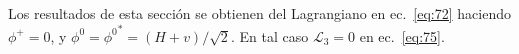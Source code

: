 Los resultados de esta secci\'on se obtienen del Lagrangiano en ec.~\eqref{eq:72} haciendo $\phi^+=0$, y $\phi^0={\phi^0}^*=(H+v)/\sqrt{2}$. En tal caso $\mathcal{L}_3=0$ en ec.~\eqref{eq:75}.

